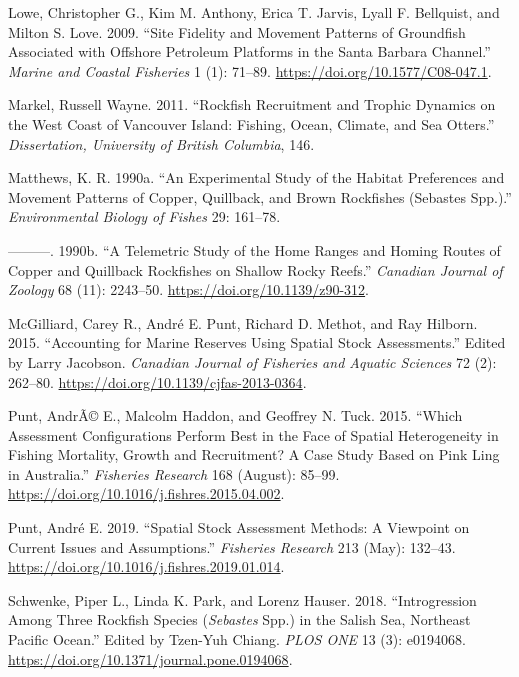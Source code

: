 \documentclass[11pt,
  english,
  letterpaper,
]{article}
\begin{document}
\leavevmode\hypertarget{ref-lowe_site_2009}{}%
Lowe, Christopher G., Kim M. Anthony, Erica T. Jarvis, Lyall F. Bellquist, and Milton S. Love. 2009. ``Site Fidelity and Movement Patterns of Groundfish Associated with Offshore Petroleum Platforms in the Santa Barbara Channel.'' \emph{Marine and Coastal Fisheries} 1 (1): 71--89. \url{https://doi.org/10.1577/C08-047.1}.

\leavevmode\hypertarget{ref-markel_rockfish_2011}{}%
Markel, Russell Wayne. 2011. ``Rockfish Recruitment and Trophic Dynamics on the West Coast of Vancouver Island: Fishing, Ocean, Climate, and Sea Otters.'' \emph{Dissertation, University of British Columbia}, 146.

\leavevmode\hypertarget{ref-matthews_seasonal_home_range_1990}{}%
Matthews, K. R. 1990a. ``An Experimental Study of the Habitat Preferences and Movement Patterns of Copper, Quillback, and Brown Rockfishes (Sebastes Spp.).'' \emph{Environmental Biology of Fishes} 29: 161--78.

\leavevmode\hypertarget{ref-matthews_telemetry_1990}{}%
---------. 1990b. ``A Telemetric Study of the Home Ranges and Homing Routes of Copper and Quillback Rockfishes on Shallow Rocky Reefs.'' \emph{Canadian Journal of Zoology} 68 (11): 2243--50. \url{https://doi.org/10.1139/z90-312}.

\leavevmode\hypertarget{ref-mcgilliard_accounting_2015}{}%
McGilliard, Carey R., André E. Punt, Richard D. Methot, and Ray Hilborn. 2015. ``Accounting for Marine Reserves Using Spatial Stock Assessments.'' Edited by Larry Jacobson. \emph{Canadian Journal of Fisheries and Aquatic Sciences} 72 (2): 262--80. \url{https://doi.org/10.1139/cjfas-2013-0364}.

\leavevmode\hypertarget{ref-punt_which_2015}{}%
Punt, AndrÃ© E., Malcolm Haddon, and Geoffrey N. Tuck. 2015. ``Which Assessment Configurations Perform Best in the Face of Spatial Heterogeneity in Fishing Mortality, Growth and Recruitment? A Case Study Based on Pink Ling in Australia.'' \emph{Fisheries Research} 168 (August): 85--99. \url{https://doi.org/10.1016/j.fishres.2015.04.002}.

\leavevmode\hypertarget{ref-punt_spatial_2019}{}%
Punt, André E. 2019. ``Spatial Stock Assessment Methods: A Viewpoint on Current Issues and Assumptions.'' \emph{Fisheries Research} 213 (May): 132--43. \url{https://doi.org/10.1016/j.fishres.2019.01.014}.

\leavevmode\hypertarget{ref-schwenke_introgression_2018}{}%
Schwenke, Piper L., Linda K. Park, and Lorenz Hauser. 2018. ``Introgression Among Three Rockfish Species (\emph{Sebastes} Spp.) in the Salish Sea, Northeast Pacific Ocean.'' Edited by Tzen-Yuh Chiang. \emph{PLOS ONE} 13 (3): e0194068. \url{https://doi.org/10.1371/journal.pone.0194068}.
\end{document}
